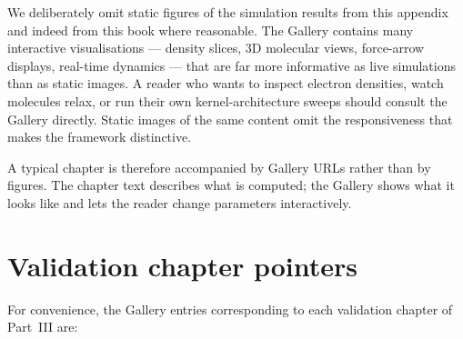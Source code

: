 We deliberately omit static figures of the simulation results from this appendix and indeed from this book where reasonable. The Gallery contains many interactive visualisations --- density slices, 3D molecular views, force-arrow displays, real-time dynamics --- that are far more informative as live simulations than as static images. A reader who wants to inspect electron densities, watch molecules relax, or run their own kernel-architecture sweeps should consult the Gallery directly. Static images of the same content omit the responsiveness that makes the framework distinctive.

A typical chapter is therefore accompanied by Gallery URLs rather than by figures. The chapter text describes what is computed; the Gallery shows what it looks like and lets the reader change parameters interactively.

\section{Validation chapter pointers}\label{sec:chapter-pointers}

For convenience, the Gallery entries corresponding to each validation chapter of Part~III are:

